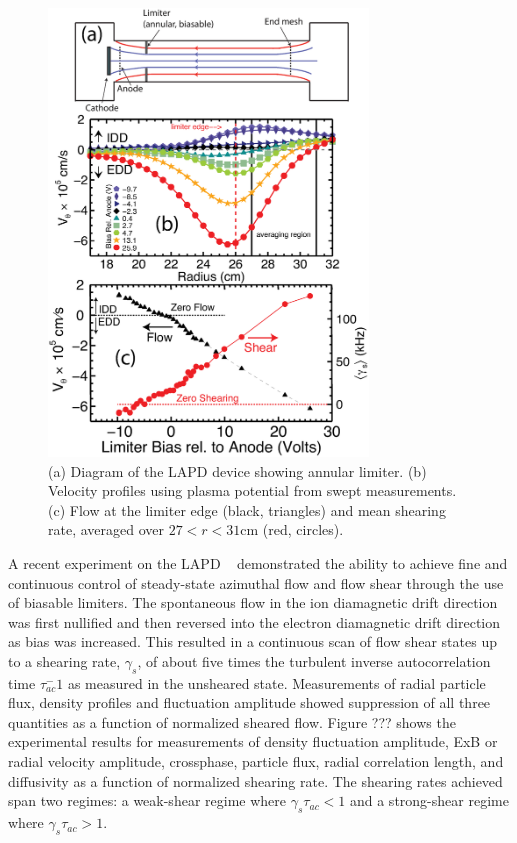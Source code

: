 \documentclass[aip,pop,amsmath,amssymb,reprint,superscriptaddress]{revtex4-1} %
\begin{document}
\begin{figure}[!htbp]
\centerline{
\includegraphics[width=8.5cm]{figure1.eps}}
\caption{\label{fig:velocity_flowshear} (a) Diagram of the LAPD device showing annular limiter.  (b) Velocity profiles using plasma potential from swept measurements. (c) Flow at the limiter edge (black, triangles) and mean shearing rate, averaged over $27 < r < 31$cm (red, circles).}
\end{figure}

A recent experiment on the LAPD ~\cite{schaffner12} demonstrated the ability to achieve fine and continuous control of steady-state azimuthal flow and flow shear through the use of biasable limiters. The spontaneous flow in the ion diamagnetic drift direction was first nullified and then reversed into the electron diamagnetic drift direction as bias was increased. This resulted in a continuous scan of flow shear states up to a shearing rate, $\gamma_s$, of about five times the turbulent inverse autocorrelation time  $\tau_{ac}^-1$ as measured in the unsheared state. Measurements of radial particle flux, density profiles and fluctuation amplitude showed suppression of all three quantities as a function of normalized sheared flow. Figure ??? shows the experimental results for measurements of density fluctuation amplitude, ExB or radial velocity amplitude, crossphase, particle flux, radial correlation length, and diffusivity as a function of normalized shearing rate. The shearing rates achieved span two regimes: a weak-shear regime where $\gamma_{s}\tau_{ac} < 1$ and a strong-shear regime where $\gamma_{s}\tau_{ac} > 1$.
\end{document}
